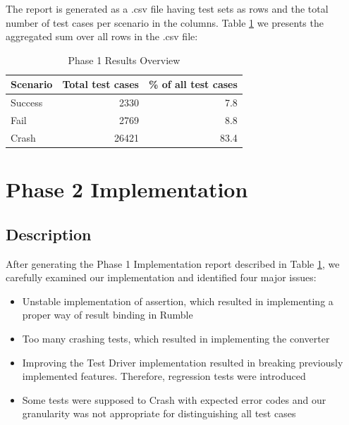 The report is generated as a .csv file having test sets as rows and the total number of test cases per scenario in the columns. Table \ref{tab:Phase1_ResultTable} we presents the aggregated sum over all rows in the .csv file:
\begin{table}[h!]
	\centering
	\begin{tabular}{|l|r|r|}
		\hline
		\multicolumn{1}{|c|}{Scenario} & \multicolumn{1}{c|}{Total test cases} & \multicolumn{1}{c|}{\% of all test cases} \\ \hline
		Success                        & 2330                                  & 7.8                                       \\ \hline
		Fail                           & 2769                                  & 8.8                                       \\ \hline
		Crash                          & 26421                                 & 83.4                                      \\ \hline
	\end{tabular}
 	\caption{Phase 1 Results Overview}
 	\label{tab:Phase1_ResultTable}
\end{table}

\section{Phase 2 Implementation}
\subsection{Description}
\label{Phase2_Description}
After generating the Phase 1 Implementation report described in Table \ref{tab:Phase1_ResultTable}, we carefully examined our implementation and identified four major issues:
\begin{itemize}
	\item Unstable implementation of assertion, which resulted in implementing a proper way of result binding in Rumble
	\item Too many crashing tests, which resulted in implementing the converter
	\item Improving the Test Driver implementation resulted in breaking previously implemented features. Therefore, regression tests were introduced
	\item Some tests were supposed to Crash with expected error codes and our granularity was not appropriate for distinguishing all test cases
\end{itemize}

